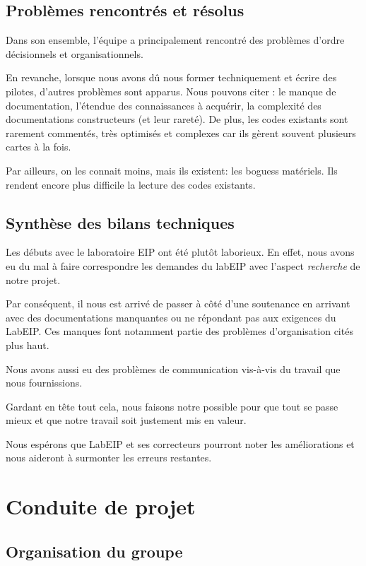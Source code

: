 \documentclass[francais]{rtxreport}
\begin{document}
\section{Problèmes rencontrés et résolus}

Dans son ensemble, l'équipe a principalement rencontré des problèmes d'ordre
décisionnels et organisationnels.

En revanche, lorsque nous avons dû nous former techniquement et écrire des
pilotes, d'autres problèmes sont apparus. Nous pouvons citer : le manque de
documentation, l’étendue des connaissances à acquérir, la complexité des
documentations constructeurs (et leur rareté). De plus, les codes existants sont
rarement commentés, très optimisés et complexes car ils gèrent souvent
plusieurs cartes à la fois.

Par ailleurs, on les connait moins, mais ils existent: les boguess
matériels. Ils rendent encore plus difficile la lecture des codes existants.

\section{Synthèse des bilans techniques}

Les débuts avec le laboratoire EIP ont été plutôt laborieux. En effet, nous
avons eu du mal à faire correspondre les demandes du labEIP avec l'aspect
\emph{recherche} de notre projet.

Par conséquent, il nous est arrivé de passer à côté d’une soutenance en arrivant
avec des documentations manquantes ou ne répondant pas aux exigences du LabEIP.
Ces manques font notamment partie des problèmes d'organisation cités plus haut.

Nous avons aussi eu des problèmes de communication vis-à-vis du travail que nous
fournissions.

Gardant en tête tout cela, nous faisons notre possible pour que tout se passe
mieux et que notre travail soit justement mis en valeur.

Nous espérons que LabEIP et ses correcteurs pourront noter les améliorations et
nous aideront à surmonter les erreurs restantes.

\chapter{Conduite de projet}

\section{Organisation du groupe}
\end{document}
